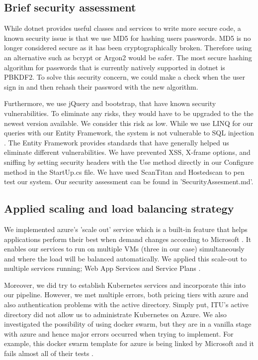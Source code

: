 \documentclass{article}
\begin{document}
\subsection{Brief security assessment} 
While dotnet provides useful classes and services to write more secure code, a known security issue is that we use MD5 for hashing users passwords. MD5 is no longer considered secure as it has been cryptographically broken. Therefore using an alternative such as bcrypt or Argon2 would be safer. The most secure hashing algorithm for passwords that is currently natively supported in dotnet is PBKDF2. To solve this security concern, we could make a check when the user sign in and then rehash their password with the new algorithm.

Furthermore, we use jQuery and bootstrap, that have known security vulnerabilities. To eliminate any risks, they would have to be upgraded to the the newest version available. We consider this risk as low. 
While we use LINQ for our queries with our Entity Framework, the system is not vulnerable to SQL injection \cite{netMic}. The Entity Framework provides standards that have generally helped us eliminate different vulnerabilities. We have prevented XSS, X-frame options, and sniffing by setting security headers with the Use method directly in our Configure method in the StartUp.cs file. We have used ScanTitan \cite{titan} and Hostedscan \cite{hostedscan} to pen test our system. Our security assessment can be found in 'SecurityAssesment.md'.

\subsection{Applied scaling and load balancing strategy} 
We implemented azure's 'scale out' service which is a built-in feature that helps applications perform their best when demand changes according to Microsoft \cite{scaleout}. It enables our services to run on multiple VMs (three in our case) simultaneously and where the load will be balanced automatically. We applied this scale-out to multiple services running; Web App Services and Service Plans \cite{scaleout}. 

Moreover, we did try to establish Kubernetes services and incorporate this into our pipeline. However, we met multiple errors, both pricing tiers with azure and also authentication problems with the active directory. Simply put, ITU's active directory did not allow us to administrate Kubernetes on Azure. We also investigated the possibility of using docker swarm, but they are in a vanilla stage with azure and hence major errors occurred when trying to implement. For example, this docker swarm template for azure is being linked by Microsoft and it fails almost all of their tests \cite{dockerswarm}.
\end{document}
